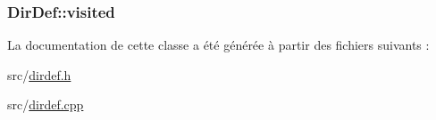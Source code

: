 \subsubsection[{visited}]{ Dir\+Def\+::visited}\label{class_dir_def_ad670e7303ad663e73665b9494f0fba4a}


La documentation de cette classe a été générée à partir des fichiers suivants \+:\begin{DoxyCompactItemize}
\item 
src/\hyperlink{dirdef_8h}{dirdef.\+h}\item 
src/\hyperlink{dirdef_8cpp}{dirdef.\+cpp}\end{DoxyCompactItemize}
